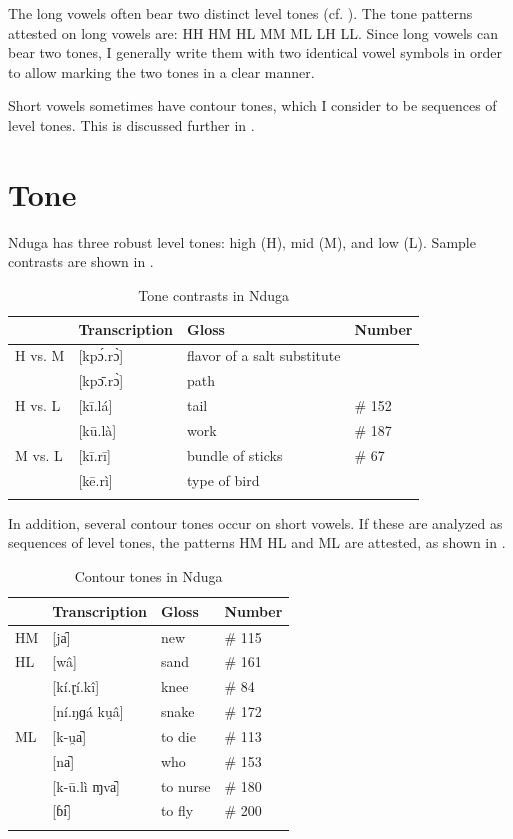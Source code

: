 \documentclass[output=paper,colorlinks,citecolor=brown
]{langscibook}
\begin{document}
The long vowels often bear two distinct level tones (cf. ). The tone patterns attested on long vowels are: HH HM HL MM ML LH LL. Since long vowels can bear two tones, I generally write them with two identical vowel symbols in order to allow marking the two tones in a clear manner.

Short vowels sometimes have contour tones, which I consider to be sequences of level tones. This is discussed further in  .

\section{Tone}
\label{sec:olson:tone}

Nduga has three robust level tones: high (H), mid (M), and low (L). Sample contrasts are shown in . 

\begin{table}
\caption{Tone contrasts in Nduga}
\label{tab:olson:tonecontrasts}
 \begin{tabular}{llll}
  \lsptoprule
         & Transcription & Gloss & Number \\
  \midrule
 H vs. M & [kpɔ́.rɔ̀] & flavor of a salt substitute & \\
         & [kpɔ̄.rɔ̀] & path & \\
 H vs. L & [kī.lá]  & tail & \# 152 \\
         & [kū.là]  & work & \# 187 \\
 M vs. L & [kī.rī]  & bundle of sticks & \# 67 \\
         & [kē.rì]  & type of bird & \\ 
  \lspbottomrule
 \end{tabular}
\end{table}

In addition, several contour tones occur on short vowels. If these are analyzed as sequences of level tones, the patterns HM HL and ML are attested, as shown in .

\begin{table}
\caption{Contour tones in Nduga}
\label{tab:olson:contour}
 \begin{tabular}{llll}
  \lsptoprule
  & Transcription & Gloss & Number \\
  \midrule
 HM & [ja᷇]  & new  & \# 115 \\
 HL & [wâ]  & sand & \# 161 \\
    & [kí.ɽí.kî] & knee & \# 84 \\
    & [ní.ŋɡá ku̯â] & snake & \# 172 \\
 ML & [k-u̯a᷆] & to die & \# 113 \\
    & [na᷆]  & who  & \# 153 \\
    & [k-ū.lì ɱva᷆] & to nurse & \# 180 \\
    & [ɓi᷆]  & to fly & \# 200 \\
  \lspbottomrule
 \end{tabular}
\end{table}
\end{document}
